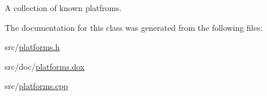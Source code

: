 A collection of known platfroms. 



The documentation for this class was generated from the following files\-:\begin{DoxyCompactItemize}
\item 
src/\hyperlink{platforms_8h}{platforms.\-h}\item 
src/doc/\hyperlink{platforms_8dox}{platforms.\-dox}\item 
src/\hyperlink{platforms_8cpp}{platforms.\-cpp}\end{DoxyCompactItemize}
